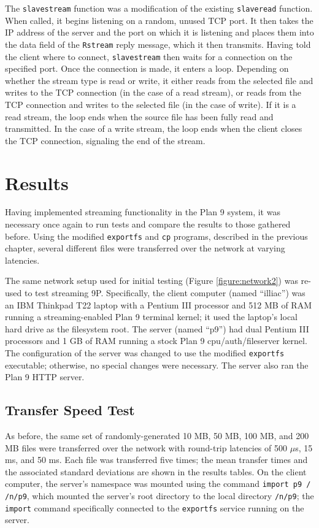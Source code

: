 \documentclass[11pt,american]{report}
\begin{document}
The {\tt slavestream} function was a modification of the existing {\tt slaveread} function. When called, it begins listening on a random, unused TCP port. It then takes the IP address of the server and the port on which it is listening and places them into the data field of the {\tt Rstream} reply message, which it then transmits. Having told the client where to connect, {\tt slavestream} then waits for a connection on the specified port. Once the connection is made, it enters a loop. Depending on whether the stream type is read or write, it either reads from the selected file and writes to the TCP connection (in the case of a read stream), or reads from the TCP connection and writes to the selected file (in the case of write). If it is a read stream, the loop ends when the source file has been fully read and transmitted. In the case of a write stream, the loop ends when the client closes the TCP connection, signaling the end of the stream.

\chapter{Results}

Having implemented streaming functionality in the Plan 9 system, it was necessary once again to run tests and compare the results to those gathered before. Using the modified {\tt exportfs} and {\tt cp} programs, described in the previous chapter, several different files were transferred over the network at varying latencies.

The same network setup used for initial testing (Figure \ref{figure:network2}) was re-used to test streaming 9P. Specifically, the client computer (named ``illiac'') was an IBM Thinkpad T22 laptop with a Pentium III processor and 512 MB of RAM running a streaming-enabled Plan 9 terminal kernel; it used the laptop's local hard drive as the filesystem root. The server (named ``p9'') had dual Pentium III processors and 1 GB of RAM running a stock Plan 9 cpu/auth/fileserver kernel. The configuration of the server was changed to use the modified {\tt exportfs} executable; otherwise, no special changes were necessary. The server also ran the Plan 9 HTTP server.

\section{Transfer Speed Test}

As before, the same set of randomly-generated 10 MB, 50 MB, 100 MB, and 200 MB files were transferred over the network with round-trip latencies of 500 $\mu$s, 15 ms, and 50 ms. Each file was transferred five times; the mean transfer times and the associated standard deviations are shown in the results tables. On the client computer, the server's namespace was mounted using the command {\tt import p9 / /n/p9}, which mounted the server's root directory to the local directory {\tt /n/p9}; the {\tt import} command specifically connected to the {\tt exportfs} service running on the server.
\end{document}
